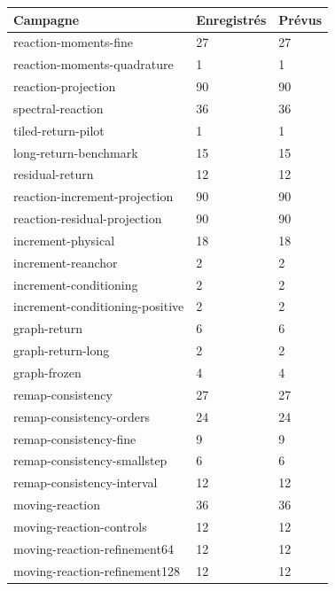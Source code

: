 \documentclass[10pt,a4paper]{article}
\begin{document}
\begin{center}\small\begin{tabular}{lll}\toprule
Campagne & Enregistrés & Prévus\\\midrule
reaction-moments-fine & 27 & 27\\
reaction-moments-quadrature & 1 & 1\\
reaction-projection & 90 & 90\\
spectral-reaction & 36 & 36\\
tiled-return-pilot & 1 & 1\\
long-return-benchmark & 15 & 15\\
residual-return & 12 & 12\\
reaction-increment-projection & 90 & 90\\
reaction-residual-projection & 90 & 90\\
increment-physical & 18 & 18\\
increment-reanchor & 2 & 2\\
increment-conditioning & 2 & 2\\
increment-conditioning-positive & 2 & 2\\
graph-return & 6 & 6\\
graph-return-long & 2 & 2\\
graph-frozen & 4 & 4\\
remap-consistency & 27 & 27\\
remap-consistency-orders & 24 & 24\\
remap-consistency-fine & 9 & 9\\
remap-consistency-smallstep & 6 & 6\\
remap-consistency-interval & 12 & 12\\
moving-reaction & 36 & 36\\
moving-reaction-controls & 12 & 12\\
moving-reaction-refinement64 & 12 & 12\\
moving-reaction-refinement128 & 12 & 12\\
\bottomrule\end{tabular}\end{center}
\end{document}
